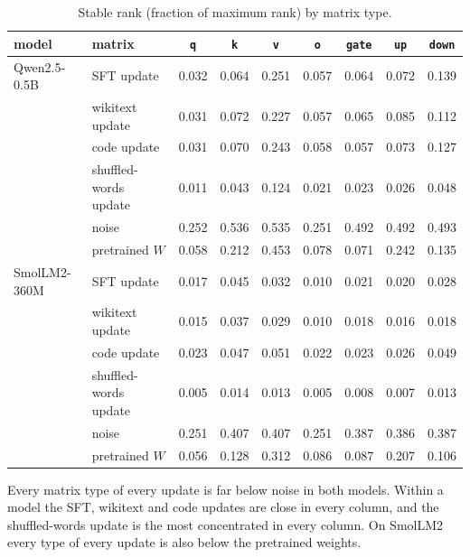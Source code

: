 \begin{table}[H]
\caption{Stable rank (fraction of maximum rank) by matrix type.}
\label{tab:pertype}
\begin{center}
\small
\begin{tabular}{llccccccc}
\toprule
model & matrix & \texttt{q} & \texttt{k} & \texttt{v} & \texttt{o} & \texttt{gate} & \texttt{up} & \texttt{down} \\
\midrule
Qwen2.5-0.5B & SFT update            & 0.032 & 0.064 & 0.251 & 0.057 & 0.064 & 0.072 & 0.139 \\
             & wikitext update       & 0.031 & 0.072 & 0.227 & 0.057 & 0.065 & 0.085 & 0.112 \\
             & code update           & 0.031 & 0.070 & 0.243 & 0.058 & 0.057 & 0.073 & 0.127 \\
             & shuffled-words update & 0.011 & 0.043 & 0.124 & 0.021 & 0.023 & 0.026 & 0.048 \\
             & noise                 & 0.252 & 0.536 & 0.535 & 0.251 & 0.492 & 0.492 & 0.493 \\
             & pretrained $W$        & 0.058 & 0.212 & 0.453 & 0.078 & 0.071 & 0.242 & 0.135 \\
\midrule
SmolLM2-360M & SFT update            & 0.017 & 0.045 & 0.032 & 0.010 & 0.021 & 0.020 & 0.028 \\
             & wikitext update       & 0.015 & 0.037 & 0.029 & 0.010 & 0.018 & 0.016 & 0.018 \\
             & code update           & 0.023 & 0.047 & 0.051 & 0.022 & 0.023 & 0.026 & 0.049 \\
             & shuffled-words update & 0.005 & 0.014 & 0.013 & 0.005 & 0.008 & 0.007 & 0.013 \\
             & noise                 & 0.251 & 0.407 & 0.407 & 0.251 & 0.387 & 0.386 & 0.387 \\
             & pretrained $W$        & 0.056 & 0.128 & 0.312 & 0.086 & 0.087 & 0.207 & 0.106 \\
\bottomrule
\end{tabular}
\end{center}
\end{table}

Every matrix type of every update is far below noise in both models. Within a
model the SFT, wikitext and code updates are close in every column, and the
shuffled-words update is the most concentrated in every column. On SmolLM2
every type of every update is also below the pretrained weights.

